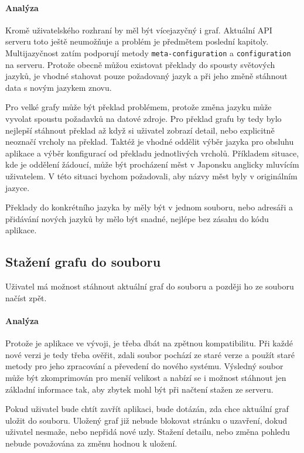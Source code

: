 \paragraph{Analýza} Kromě uživatelského rozhraní by měl být vícejazyčný i graf. Aktuální API serveru toto ještě neumožňuje a problém je předmětem poslední kapitoly. Multijazyčnost zatím podporují metody \texttt{meta-configuration} a \texttt{configuration} na serveru. Protože obecně můžou existovat překlady do spousty světových jazyků, je vhodné stahovat pouze požadovaný jazyk a při jeho změně stáhnout data s novým jazykem znovu.

Pro velké grafy může být překlad problémem, protože změna jazyku může vyvolat spoustu požadavků na datové zdroje. Pro překlad grafu by tedy bylo nejlepší stáhnout překlad až když si uživatel zobrazí detail, nebo explicitně neoznačí vrcholy na překlad. Taktéž je vhodné oddělit výběr jazyka pro obsluhu aplikace a výběr konfigurací od překladu jednotlivých vrcholů. Příkladem situace, kde je oddělení žádoucí, může být procházení měst v Japonsku anglicky mluvícím uživatelem. V této situaci bychom požadovali, aby názvy měst byly v originálním jazyce.

Překlady do konkrétního jazyka by měly být v jednom souboru, nebo adresáři a přidávání nových jazyků by mělo být snadné, nejlépe bez zásahu do kódu aplikace.

\subsection*{Stažení grafu do souboru}
Uživatel má možnost stáhnout aktuální graf do souboru a později ho ze souboru načíst zpět.

\paragraph{Analýza} Protože je aplikace ve vývoji, je třeba dbát na zpětnou kompatibilitu. Při každé nové verzi je tedy třeba ověřit, zdali soubor pochází ze staré verze a použít staré metody pro jeho zpracování a převedení do nového systému. Výsledný soubor může být zkomprimován pro menší velikost a nabízí se i možnost stáhnout jen základní informace tak, aby zbytek mohl být při načtení stažen ze serveru.

Pokud uživatel bude chtít zavřít aplikaci, bude dotázán, zda chce aktuální graf uložit do souboru. Uložený graf již nebude blokovat stránku o uzavření, dokud uživatel nesmaže, nebo nepřidá nové uzly. Stažení detailu, nebo změna pohledu nebude považována za změnu hodnou k uložení.

